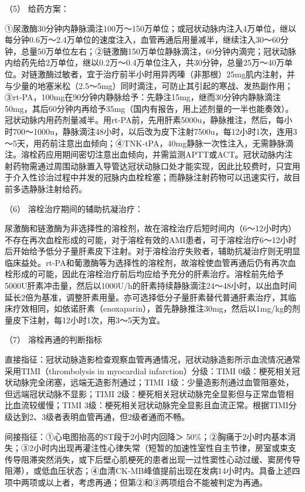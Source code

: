\hypertarget{text00312.htmlux5cux23CHP10-8-2-3-4-2-1-5}{}
（5） 给药方案：

①尿激酶30分钟内静脉滴注100万～150万单位；或冠状动脉内注入4万单位，继以每分钟0.6万～2.4万单位的速度注入，血管再通后用量减半，继续注入30～60分钟，总量50万单位左右；②链激酶150万单位静脉滴注，60分钟内滴完；冠状动脉内给药先给2万单位，继以0.2万～0.4万单位注入，共30分钟，总量25万～40万单位。对链激酶过敏者，宜于治疗前半小时用异丙嗪（非那根）25mg肌内注射，并与少量的地塞米松（2.5～5mg）同时滴注，可防止其引起的寒战、发热副作用；③rt-PA，100mg在90分钟内静脉给予：先静注15mg，继而30分钟内静脉滴注50mg，其后60分钟内再给予35mg（国内有报告，用上述剂量的一半也能奏效）。冠状动脉内用药剂量减半。用rt-PA前，先用肝素5000u，静脉推注，然后，每小时700～1000u，静脉滴注48小时，以后改为皮下注射7500u，每12小时1次，连用3～5天，用药前注意出血倾向；④TNK-tPA，40mg静脉一次性注入，无需静脉滴注。溶栓药应用期间密切注意出血倾向，并需监测APTT或ACT。冠状动脉内注射药物需通过周围动脉置入导管达冠状动脉口处才能实现，因此比较费时，只宜用于介入性诊治过程中并发的冠脉内血栓栓塞；而静脉注射药物可以迅速实行，故目前多选静脉注射给药。

\hypertarget{text00312.htmlux5cux23CHP10-8-2-3-4-2-1-6}{}
（6） 溶栓治疗期间的辅助抗凝治疗：

尿激酶和链激酶为非选择性的溶栓剂，故在溶栓治疗后短时间内（6～12小时内）不存在再次血栓形成的可能，对于溶栓有效的AMI患者，可于溶栓治疗6～12小时后开始给予低分子量肝素皮下注射。对于溶栓治疗失败者，辅助抗凝治疗则无明显临床益处。rt-PA和葡激酶等为选择性的溶栓剂，故溶栓使血管再通后仍有再次血栓形成的可能，因此在溶栓治疗前后均应给予充分的肝素治疗。溶栓前先给予5000U肝素冲击量，然后以1000U/h的肝素持续静脉滴注24～48小时，以出血时间延长2倍为基准，调整肝素用量。亦可选择低分子量肝素替代普通肝素治疗，其临床疗效相同，如依诺肝素（enoxaparin），首先静脉推注30mg，然后以1mg/kg的剂量皮下注射，每12小时1次，用3～5天为宜。

\hypertarget{text00312.htmlux5cux23CHP10-8-2-3-4-2-1-7}{}
（7） 溶栓再通的判断指标

直接指征：冠状动脉造影检查观察血管再通情况，冠状动脉造影所示血流情况通常采用TIMI（thrombolysis
in myocardial infarction）分级：TIMI
0级：梗死相关冠状动脉完全闭塞，远端无造影剂通过；TIMI
1级：少量造影剂通过血管阻塞处，但远端冠状动脉不显影；TIMI
2级：梗死相关冠状动脉完全显影但与正常血管相比血流较缓慢；TIMI
3级：梗死相关冠状动脉完全显影且血流正常。根据TIMI分级达到2、3级者表明血管再通，但2级者通而不畅。

间接指征：①心电图抬高的ST段于2小时内回降＞
50\%；②胸痛于2小时内基本消失；③2小时内出现再灌注性心律失常（短暂的加速性室性自主节律，房室或束支传导阻滞突然消失，或下后壁心肌梗死的患者出现一过性窦性心动过缓、窦房传导阻滞），或低血压状态；④血清CK-MB峰值提前出现在发病14小时内。具备上述四项中两项或以上者，考虑再通；但第②和③两项组合不能被判定为再通。

